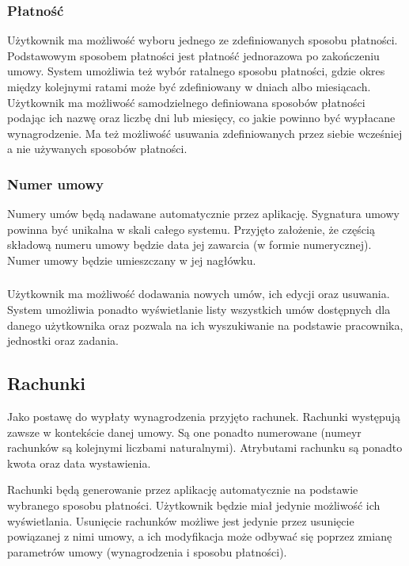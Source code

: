 \subsubsection{Płatność}
Użytkownik ma możliwość wyboru jednego ze zdefiniowanych sposobu płatności. Podstawowym sposobem płatności jest płatność jednorazowa po zakończeniu umowy. System umożliwia też wybór ratalnego sposobu płatności, gdzie okres między kolejnymi ratami może być zdefiniowany w dniach albo miesiącach. Użytkownik ma możliwość samodzielnego definiowana sposobów płatności podając ich nazwę oraz liczbę dni lub miesięcy, co jakie powinno być wypłacane wynagrodzenie. Ma też możliwość usuwania zdefiniowanych przez siebie wcześniej a nie używanych sposobów płatności. 

\subsubsection{Numer umowy}
Numery umów będą nadawane automatycznie przez aplikację. Sygnatura umowy powinna być unikalna w skali całego systemu. Przyjęto założenie, że częścią składową numeru umowy będzie data jej zawarcia (w formie numerycznej). Numer umowy będzie umieszczany w jej nagłówku.

\subsubsection{}
Użytkownik ma możliwość dodawania nowych umów, ich edycji oraz usuwania. System umożliwia ponadto wyświetlanie listy wszystkich umów dostępnych dla danego użytkownika oraz pozwala na ich wyszukiwanie na podstawie pracownika, jednostki oraz zadania.

\subsection[Rachunki][Rachunki]{Rachunki}
Jako postawę do wypłaty wynagrodzenia przyjęto rachunek. Rachunki występują zawsze w kontekście danej umowy. Są one ponadto numerowane (numeyr rachunków są kolejnymi liczbami naturalnymi). Atrybutami rachunku są ponadto kwota oraz data wystawienia.

Rachunki będą generowanie przez aplikację automatycznie na podstawie wybranego sposobu płatności. Użytkownik będzie miał jedynie możliwość ich wyświetlania. Usunięcie rachunków możliwe jest jedynie przez usunięcie powiązanej z nimi umowy, a ich modyfikacja może odbywać się poprzez zmianę parametrów umowy (wynagrodzenia i sposobu płatności).

